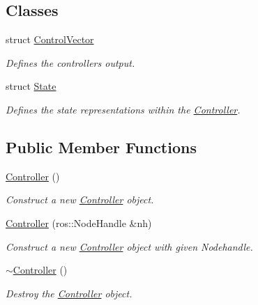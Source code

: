 \subsection*{Classes}
\begin{DoxyCompactItemize}
\item 
struct \hyperlink{structController_1_1ControlVector}{Control\+Vector}
\begin{DoxyCompactList}\small\item\em Defines the controllers output. \end{DoxyCompactList}\item 
struct \hyperlink{structController_1_1State}{State}
\begin{DoxyCompactList}\small\item\em Defines the state representations within the \hyperlink{classController}{Controller}. \end{DoxyCompactList}\end{DoxyCompactItemize}
\subsection*{Public Member Functions}
\begin{DoxyCompactItemize}
\item 
\mbox{\label{classController_a95c56822d667e94b031451729ce069a9}} 
\hyperlink{classController_a95c56822d667e94b031451729ce069a9}{Controller} ()
\begin{DoxyCompactList}\small\item\em Construct a new \hyperlink{classController}{Controller} object. \end{DoxyCompactList}\item 
\hyperlink{classController_a7341f9092e1977cdd2a1492c4422c019}{Controller} (ros\+::\+Node\+Handle \&nh)
\begin{DoxyCompactList}\small\item\em Construct a new \hyperlink{classController}{Controller} object with given Nodehandle. \end{DoxyCompactList}\item 
\mbox{\label{classController_a0ab87934c4f7a266cfdb86e0f36bc1b5}} 
\hyperlink{classController_a0ab87934c4f7a266cfdb86e0f36bc1b5}{$\sim$\+Controller} ()
\begin{DoxyCompactList}\small\item\em Destroy the \hyperlink{classController}{Controller} object. \end{DoxyCompactList}\end{DoxyCompactItemize}
